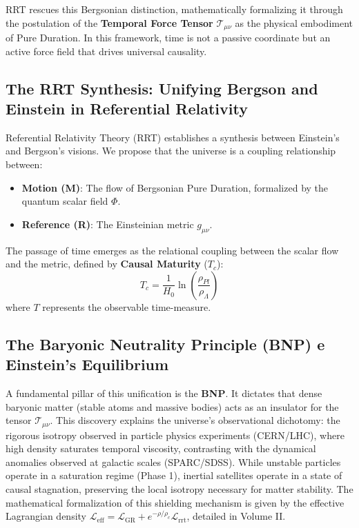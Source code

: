 \documentclass[12pt,a4paper]{article}
\begin{document}
RRT rescues this Bergsonian distinction, mathematically formalizing it through the postulation of the \textbf{Temporal Force Tensor} $\mathcal{T}_{\mu\nu}$ as the physical embodiment of Pure Duration. In this framework, time is not a passive coordinate but an active force field that drives universal causality.

\subsection{The RRT Synthesis: Unifying Bergson and Einstein in Referential Relativity}
Referential Relativity Theory (RRT) establishes a synthesis between Einstein's and Bergson's visions. We propose that the universe is a coupling relationship between:
\begin{itemize}
    \item \textbf{Motion (M)}: The flow of Bergsonian Pure Duration, formalized by the quantum scalar field $\Phi$.
    \item \textbf{Reference (R)}: The Einsteinian metric $g_{\mu\nu}$.
\end{itemize}

The passage of time emerges as the relational coupling between the scalar flow and the metric, defined by \textbf{Causal Maturity} ($T_c$): \begin{equation} T_c = \frac{1}{H_0} \ln\left( \frac{\rho_{Pl}}{\rho_{\Lambda}} \right) \end{equation}
where $T$ represents the observable time-measure.

\subsection{The Baryonic Neutrality Principle (BNP) e Einstein's Equilibrium}
A fundamental pillar of this unification is the \textbf{BNP}. It dictates that dense baryonic matter (stable atoms and massive bodies) acts as an insulator for the tensor $\mathcal{T}_{\mu\nu}$. This discovery explains the universe's observational dichotomy: the rigorous isotropy observed in particle physics experiments (CERN/LHC), where high density saturates temporal viscosity, contrasting with the dynamical anomalies observed at galactic scales (SPARC/SDSS). While unstable particles operate in a saturation regime (Phase 1), inertial satellites operate in a state of causal stagnation, preserving the local isotropy necessary for matter stability. The mathematical formalization of this shielding mechanism is given by the effective Lagrangian density $\mathcal{L}_{\text{eff}} = \mathcal{L}_{\text{GR}} + e^{-\rho/\rho_c} \mathcal{L}_{\text{rrt}}$, detailed in Volume II.
\end{document}
